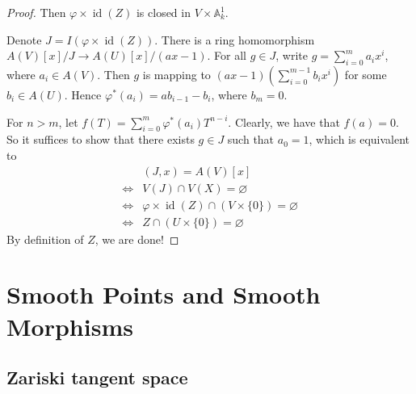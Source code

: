 \documentclass{ctexart}
\newcommand{\identity}{\operatorname{id}}
\begin{document}
\begin{proof}
    Then $\varphi \times \identity(Z)$ is closed in $V \times \mathbb{A}_{k}^{1}$.
    \par
    Denote $J = I(\varphi \times \identity(Z))$.
    There is a ring homomorphism $A(V)[x]/J \rightarrow A(U)[x]/(ax - 1)$.
    For all $g\in J$, write $g = \sum_{i = 0}^{m} a_{i}x^{i}$, where $a_{i}\in A(V)$.
    Then $g$ is mapping to $(ax - 1)(\sum_{i = 0}^{m - 1} b_{i}x^{i})$ for some $b_{i}\in A(U)$.
    Hence $\varphi^{\ast}(a_{i}) = ab_{i - 1} - b_{i}$, where $b_{m} = 0$.
    \par
    For $n > m$, let $f(T) = \sum_{i = 0}^{m} \varphi^{\ast}(a_{i})T^{n - i}$.
    Clearly, we have that $f(a) = 0$.
    So it suffices to show that there exists $g\in J$ such that $a_{0} = 1$,
    which is equivalent to 
    \begin{equation}
        \begin{split}
            & (J, x) = A(V)[x] \\
            \iff & V(J) \cap V(X) = \varnothing \\
            \iff & \varphi \times \identity(Z) \cap (V \times \{0\}) = \varnothing \\
            \iff & Z \cap (U \times \{0\}) = \varnothing
        \end{split}
    \end{equation}
    By definition of $Z$, we are done!
\end{proof}

\section{Smooth Points and Smooth Morphisms}
\label{section:Smooth_Points_and_Smooth_Morphisms}

\subsection{Zariski tangent space}
\label{subsection:Smooth_Points_and_Smooth_Morphisms_Zariski_tangent_space}
\end{document}
